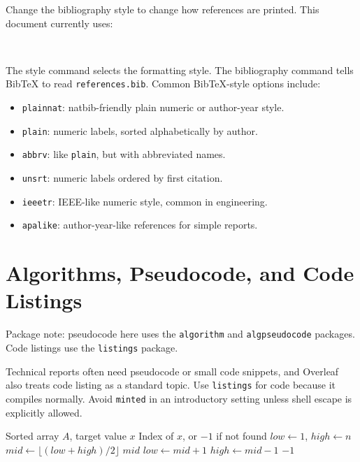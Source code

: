 \documentclass[11pt,a4paper]{article}
\begin{document}
Change the bibliography style to change how references are printed. This
document currently uses:

\begin{verbatim}


\end{verbatim}

The style command selects the formatting style. The bibliography command tells
BibTeX to read \texttt{references.bib}.
Common BibTeX-style options include:

\begin{itemize}
    \item \texttt{plainnat}: natbib-friendly plain numeric or author-year style.
    \item \texttt{plain}: numeric labels, sorted alphabetically by author.
    \item \texttt{abbrv}: like \texttt{plain}, but with abbreviated names.
    \item \texttt{unsrt}: numeric labels ordered by first citation.
    \item \texttt{ieeetr}: IEEE-like numeric style, common in engineering.
    \item \texttt{apalike}: author-year-like references for simple reports.
\end{itemize}

\section{Algorithms, Pseudocode, and Code Listings}

Package note: pseudocode here uses the \texttt{algorithm} and
\texttt{algpseudocode} packages. Code listings use the \texttt{listings}
package.

Technical reports often need pseudocode or small code snippets, and Overleaf
also treats code listing as a standard topic. Use \texttt{listings} for code
because it compiles normally. Avoid \texttt{minted} in an introductory setting
unless shell escape is explicitly allowed.

\begin{algorithm}[H]
    \caption{Binary Search}
    \label{alg:binary-search}
    \begin{algorithmic}[1]
        \Require Sorted array $A$, target value $x$
        \Ensure Index of $x$, or $-1$ if not found
        \State $low \gets 1$, $high \gets n$
            \State $mid \gets \lfloor (low + high)/2 \rfloor$
                \State \Return $mid$
                \State $low \gets mid + 1$
            \Else
                \State $high \gets mid - 1$
            \EndIf
        \EndWhile
        \State \Return $-1$
    \end{algorithmic}
\end{algorithm}
\end{document}
